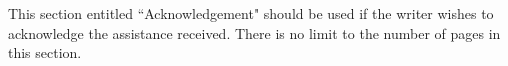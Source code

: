 \begin{acknowledgments}

This section entitled ``Acknowledgement" should be used if the writer wishes to acknowledge the assistance received. There is no limit to the number of pages in this section.

\end{acknowledgments} 